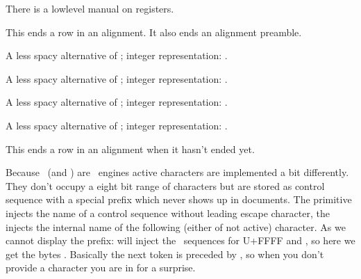 \starttyping
\newinteger\MyCounterB
{}
\stoptyping

There is a lowlevel manual on registers.

\stopoldprimitive

\startoldprimitive[title={\prm {cr}}]

This ends a row in an alignment. It also ends an alignment preamble.
\stopoldprimitive

\startnewprimitive[title={\prm {crampeddisplaystyle}}]

A less spacy alternative of ; integer representation:
\the\scriptstyle.

\stopnewprimitive

\startnewprimitive[title={\prm {crampedscriptscriptstyle}}]

A less spacy alternative of ; integer representation:
\the\scriptscriptstyle.

\stopnewprimitive

\startnewprimitive[title={\prm {crampedscriptstyle}}]

A less spacy alternative of ; integer representation:
\the\scriptstyle.

\stopnewprimitive

\startnewprimitive[title={\prm {crampedtextstyle}}]

A less spacy alternative of ; integer representation:
\the\textstyle.

\stopnewprimitive

\startoldprimitive[title={\prm {crcr}}]

This ends a row in an alignment when it hasn't ended yet.

\stopoldprimitive

\startnewprimitive[title={\prm {csactive}}]

Because \LUATEX\ (and \LUAMETATEX) are \UNICODE\ engines active characters are
implemented a bit differently. They don't occupy a eight bit range of characters
but are stored as control sequence with a special prefix  which
never shows up in documents. The  primitive injects the name of a
control sequence without leading escape character, the  injects
the internal name of the following (either of not active) character. As we cannot
display the prefix: \type {\csactive~} will inject the \UTF\ sequences for \type
{U+FFFF} and , so here we get the bytes . Basically
the next token is preceded by , so when you don't provide a
character you are in for a surprise.

